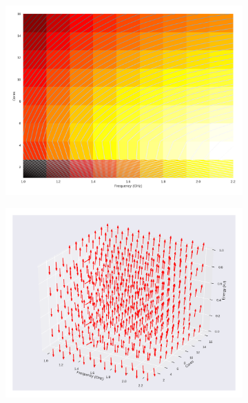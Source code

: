 \begin{figure}[H]
	\centering
	\begin{subfigure}[b]{0.45\textwidth}
		\includegraphics[width=\textwidth]{models/figures/analisys/pleak10.png}
	\end{subfigure}
	\begin{subfigure}[b]{0.45\textwidth}
		\includegraphics[width=\textwidth]{models/figures/analisys/pleak10_3d.png}
	\end{subfigure}
\end{figure}

